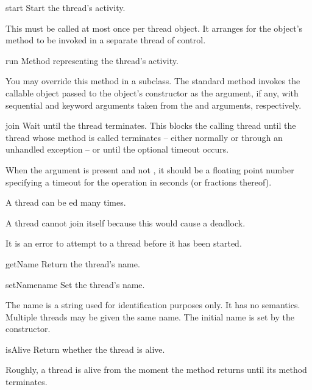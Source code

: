\begin{methoddesc}{start}{}
Start the thread's activity.

This must be called at most once per thread object.  It
arranges for the object's  method to be invoked in a
separate thread of control.
\end{methoddesc}



\begin{methoddesc}{run}{}
Method representing the thread's activity.

You may override this method in a subclass.  The standard
 method invokes the callable object passed to the object's constructor as the
 argument, if any, with sequential and keyword
arguments taken from the  and  arguments,
respectively.
\end{methoddesc}


\begin{methoddesc}{join}{}
Wait until the thread terminates.
This blocks the calling thread until the thread whose 
method is called terminates -- either normally or through an
unhandled exception -- or until the optional timeout occurs.

When the  argument is present and not , it should
be a floating point number specifying a timeout for the
operation in seconds (or fractions thereof).

A thread can be ed many times.

A thread cannot join itself because this would cause a
deadlock.

It is an error to attempt to  a thread before it has
been started.
\end{methoddesc}



\begin{methoddesc}{getName}{}
Return the thread's name.
\end{methoddesc}

\begin{methoddesc}{setName}{name}
Set the thread's name.

The name is a string used for identification purposes only.
It has no semantics.  Multiple threads may be given the same
name.  The initial name is set by the constructor.
\end{methoddesc}

\begin{methoddesc}{isAlive}{}
Return whether the thread is alive.

Roughly, a thread is alive from the moment the  method
returns until its  method terminates.
\end{methoddesc}

